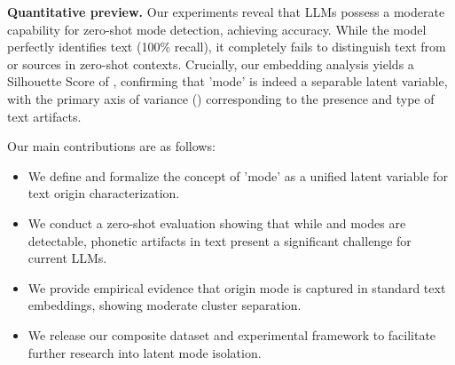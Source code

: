 {\bf Quantitative preview.}
Our experiments reveal that LLMs possess a moderate capability for zero-shot mode detection, achieving \accuracy accuracy.
While the model perfectly identifies \aigen text (100\% recall), it completely fails to distinguish \dictated text from \typed or \aigen sources in zero-shot contexts.
Crucially, our embedding analysis yields a Silhouette Score of \silhouette, confirming that 'mode' is indeed a separable latent variable, with the primary axis of variance (\pcaone) corresponding to the presence and type of text artifacts.

Our main contributions are as follows:
\begin{itemize}[leftmargin=*,itemsep=0pt,topsep=0pt]
    \item We define and formalize the concept of 'mode' as a unified latent variable for text origin characterization.
    \item We conduct a zero-shot evaluation showing that while \aigen and \typed modes are detectable, phonetic artifacts in \dictated text present a significant challenge for current LLMs.
    \item We provide empirical evidence that origin mode is captured in standard text embeddings, showing moderate cluster separation.
    \item We release our composite dataset and experimental framework to facilitate further research into latent mode isolation.
\end{itemize}
